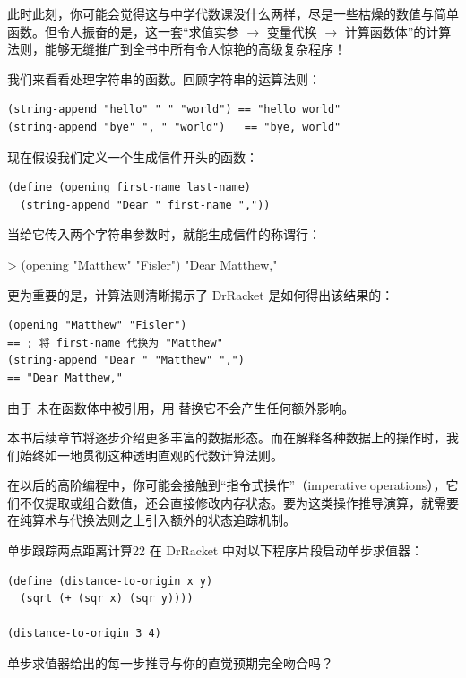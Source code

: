 此时此刻，你可能会觉得这与中学代数课没什么两样，尽是一些枯燥的数值与简单函数。但令人振奋的是，这一套“求值实参 $\rightarrow$ 变量代换 $\rightarrow$ 计算函数体”的计算法则，能够无缝推广到全书中所有令人惊艳的高级复杂程序！

我们来看看处理字符串的函数。回顾字符串的运算法则：
\begin{lstlisting}[language=BSL]
(string-append "hello" " " "world") == "hello world"
(string-append "bye" ", " "world")   == "bye, world"
\end{lstlisting}

现在假设我们定义一个生成信件开头的函数：
\begin{lstlisting}[language=BSL]
(define (opening first-name last-name)
  (string-append "Dear " first-name ","))
\end{lstlisting}

当给它传入两个字符串参数时，就能生成信件的称谓行：
\begin{replbox}
> (opening "Matthew" "Fisler")
"Dear Matthew,"
\end{replbox}

更为重要的是，计算法则清晰揭示了 DrRacket 是如何得出该结果的：
\begin{lstlisting}[language=BSL]
(opening "Matthew" "Fisler")
== ; 将 first-name 代换为 "Matthew"
(string-append "Dear " "Matthew" ",")
== "Dear Matthew,"
\end{lstlisting}
由于  未在函数体中被引用，用  替换它不会产生任何额外影响。

本书后续章节将逐步介绍更多丰富的数据形态。而在解释各种数据上的操作时，我们始终如一地贯彻这种透明直观的代数计算法则。

\begin{notebox}[指令式操作前瞻]
在以后的高阶编程中，你可能会接触到“指令式操作”（imperative operations），它们不仅提取或组合数值，还会直接修改内存状态。要为这类操作推导演算，就需要在纯算术与代换法则之上引入额外的状态追踪机制。
\end{notebox}

\begin{exercise}{单步跟踪两点距离计算}{22}
在 DrRacket 中对以下程序片段启动单步求值器：
\begin{lstlisting}[language=BSL]
(define (distance-to-origin x y)
  (sqrt (+ (sqr x) (sqr y))))

(distance-to-origin 3 4)
\end{lstlisting}
单步求值器给出的每一步推导与你的直觉预期完全吻合吗？
\end{exercise}

